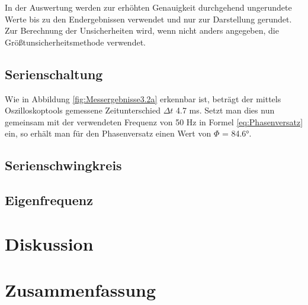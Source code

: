 \documentclass[12pt,a4paper,twoside]{article}
\begin{document}
In der Auswertung werden zur erhöhten Genauigkeit durchgehend ungerundete Werte bis zu den Endergebnissen verwendet und nur zur Darstellung gerundet. \\
Zur Berechnung der Unsicherheiten wird, wenn nicht anders angegeben, die Größtunsicherheitsmethode verwendet.

\subsection{Serienschaltung}

Wie in Abbildung \ref{fig:Messergebnisse3.2a} erkennbar ist, beträgt der mittels Oszilloskoptools gemessene Zeitunterschied $\Delta t$ 4.7 ms. Setzt man dies nun gemeinsam mit der verwendeten Frequenz von 50 Hz in Formel \ref{eq:Phasenversatz} ein, so erhält man für den Phasenversatz einen Wert von $\Phi$ = 84.6°.



\subsection{Serienschwingkreis}

\subsection{Eigenfrequenz}



\section{Diskussion} %


\section{Zusammenfassung} %


\printbibliography[heading=bibintoc]
\end{document}
